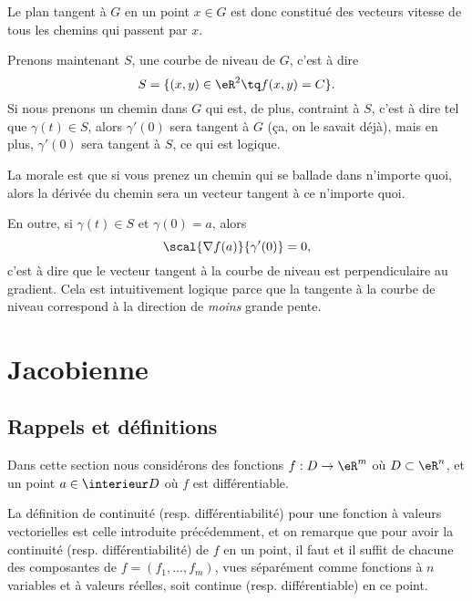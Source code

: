 Le plan tangent à $G$ en un point $x\in G$ est donc constitué des vecteurs vitesse de tous les chemins qui passent par $x$.

Prenons maintenant $S$, une courbe de niveau de $G$, c'est à dire
\begin{equation}
    S=\{ (x,y)\in\eR^2\tq f(x,y)=C \}.
\end{equation}
Si nous prenons un chemin dans $G$ qui est, de plus, contraint à $S$, c'est à dire tel que $\gamma(t)\in S$, alors $\gamma'(0)$ sera tangent à $G$ (ça, on le savait déjà), mais en plus, $\gamma'(0)$ sera tangent à $S$, ce qui est logique.

La morale est que si vous prenez un chemin qui se ballade dans n'importe quoi, alors la dérivée du chemin sera un vecteur tangent à ce n'importe quoi.

En outre, si $\gamma(t)\in S$ et $\gamma(0)=a$, alors
\begin{equation}
    \scal{\nabla f(a)}{\gamma'(0)}=0,
\end{equation}
c'est à dire que le vecteur tangent à la courbe de niveau est perpendiculaire au gradient. Cela est intuitivement logique parce que la tangente à la courbe de niveau correspond à la direction de \emph{moins} grande pente.

\section{Jacobienne}

\subsection{Rappels et définitions}

Dans cette section nous considérons des fonctions $f : D \to \eR^m$
où $D \subset \eR^n$, et un point $a \in \interieur D$ où $f$ est
différentiable.
\begin{remark}
  La définition de continuité (resp. différentiabilité) pour une
  fonction à valeurs vectorielles est celle introduite précédemment,
  et on remarque que pour avoir la continuité
  (resp. différentiabilité) de $f$ en un point, il faut et il suffit
  de chacune des composantes de $f = (f_1,\ldots, f_m)$, vues
  séparément comme fonctions à $n$ variables et à valeurs réelles,
  soit continue (resp. différentiable) en ce point.
\end{remark}

